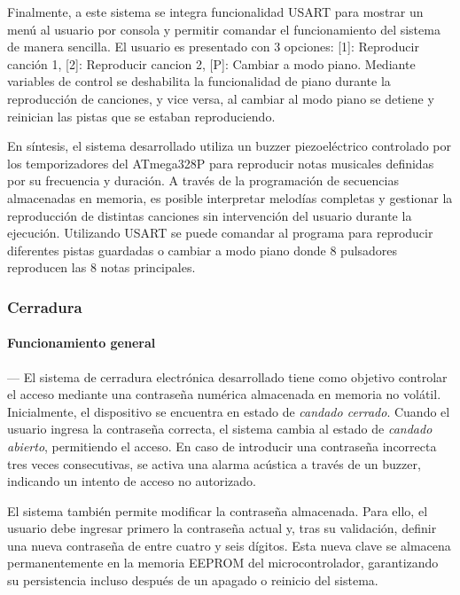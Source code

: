     \vspace{1em}

    Finalmente, a este sistema se integra funcionalidad USART para mostrar un menú al usuario por consola y permitir comandar el funcionamiento del sistema de manera sencilla. El usuario es presentado con 3 opciones: [1]: Reproducir canción 1, [2]: Reproducir cancion 2, [P]: Cambiar a modo piano. Mediante variables de control se deshabilita la funcionalidad de piano durante la reproducción de canciones, y vice versa, al cambiar al modo piano se detiene y reinician las pistas que se estaban reproduciendo.


    \vspace{1em}

    En síntesis, el sistema desarrollado utiliza un buzzer piezoeléctrico controlado por los temporizadores del ATmega328P para reproducir notas musicales definidas por su frecuencia y duración. A través de la programación de secuencias almacenadas en memoria, es posible interpretar melodías completas y gestionar la reproducción de distintas canciones sin intervención del usuario durante la ejecución. Utilizando USART se puede comandar al programa para reproducir diferentes pistas guardadas o cambiar a modo piano donde 8 pulsadores reproducen las 8 notas principales.

    \vspace{1em}

\subsubsection{\textbf{Cerradura}}
    \paragraph*{\textbf{Funcionamiento general}}---
    El sistema de cerradura electrónica desarrollado tiene como objetivo controlar el acceso mediante una contraseña numérica almacenada en memoria no volátil. Inicialmente, el dispositivo se encuentra en estado de \textit{candado cerrado}. Cuando el usuario ingresa la contraseña correcta, el sistema cambia al estado de \textit{candado abierto}, permitiendo el acceso. En caso de introducir una contraseña incorrecta tres veces consecutivas, se activa una alarma acústica a través de un buzzer, indicando un intento de acceso no autorizado.

    \vspace{1em}

    El sistema también permite modificar la contraseña almacenada. Para ello, el usuario debe ingresar primero la contraseña actual y, tras su validación, definir una nueva contraseña de entre cuatro y seis dígitos. Esta nueva clave se almacena permanentemente en la memoria EEPROM del microcontrolador, garantizando su persistencia incluso después de un apagado o reinicio del sistema.

